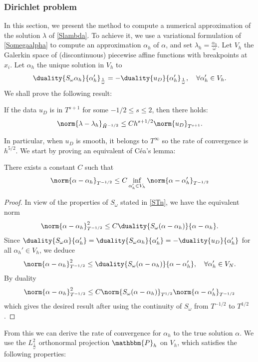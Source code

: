\documentclass[a4paper]{article}
\begin{document}
\subsubsection{Dirichlet problem}

In this section, we present the method to compute a numerical approximation of the solution $\lambda$ of \eqref{Slambda}. To achieve it, we use a variational formulation of \eqref{Somegaalpha} to compute an approximation $\alpha_h$ of $\alpha$, and set $\lambda_h = \frac{\alpha_h}{\omega}$. Let $V_h$ the Galerkin space of (discontinuous) piecewise affine functions with breakpoints at $x_i$. Let $\alpha_h$ the unique solution in $V_h$ to
\[ \duality{S_\omega \alpha_h}{\alpha_h'}_\frac{1}{\omega} = -\duality{u_D}{\alpha_h'}_\frac{1}{\omega}, \quad \forall \alpha_h' \in V_h.\]
We shall prove the following result:
\begin{The}
	If the data $u_D$ is in $T^{s+1}$ for some $-1/2 \leq s \leq 2$, then there holds:
	\[ \norm{\lambda - \lambda_h}_{\tilde{H}^{-1/2}} \leq C h^{s+1/2} \norm{u_D}_{T^{s+1}}.\]
	\label{theOrdreCVDirichlet}
\end{The}
In particular, when $u_D$ is smooth, it belongs to $T^{\infty}$ so the rate of convergence is $h^{5/2}$.
\noindent We start by proving an equivalent of Céa's lemma: 
\begin{Lem}
	\label{CeaDir}
	There exists a constant $C$ such that 
	\[\norm{\alpha - \alpha_h}_{T^{-1/2}} \leq C \inf_{{\alpha}_h' \in V_h}\norm{\alpha - {\alpha}_h'}_{T^{-1/2}}\]
	\begin{proof}
		 In view of the properties of $S_\omega$ stated in \autoref{STn}, we have the equivalent norm 
		 \[\norm{\alpha - \alpha_h}_{T^{-1/2}}^2 \leq C \duality{S_\omega(\alpha - \alpha_h)}{\alpha-\alpha_h}.\] 
		 Since $\duality{S_\omega \alpha}{\alpha_h'} = \duality{S_\omega \alpha_h}{\alpha_h'} = -\duality{u_D}{\alpha_h'}$ for all $\alpha_h' \in V_h$, we deduce 
		 \[\norm{\alpha - \alpha_h}_{T^{-1/2}}^2 \leq \duality{S_\omega (\alpha - \alpha_h)}{\alpha - \alpha'_h}, \quad \forall \alpha'_h \in V_N.\]
		 By duality
		 \[\norm{\alpha - \alpha_h}_{T^{-1/2}}^2 \leq C \norm{S_\omega(\alpha - \alpha_h)}_{T^{1/2}}\norm{\alpha - \alpha'_h}_{T^{-1/2}}\]
		 which gives the desired result after using the continuity of $S_\omega$ from $T^{-1/2}$ to $T^{1/2}$. 
	\end{proof}
\end{Lem}
From this we can derive the rate of convergence for $\alpha_h$ to the true solution $\alpha$. We use the $L^2_\frac{1}{\omega}$ orthonormal projection $\mathbbm{P}_h$ on $V_h$, which satisfies the following properties:
\end{document}
